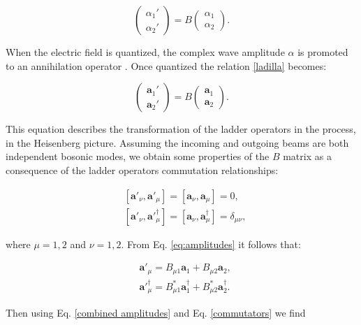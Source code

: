 \documentclass[12pt]{book}
\begin{document}
\begin{equation}
\begin{pmatrix} \alpha_{1}' \\ \alpha_{2}' \end{pmatrix}=B\begin{pmatrix} \alpha_{1} \\ \alpha_{2} \end{pmatrix}. \label{ladilla}
\end{equation}

When the electric field  is quantized, the complex wave amplitude $\alpha$ is promoted to an annihilation operator \cite{ludon}. Once quantized the relation \ref{ladilla} becomes:

\begin{equation}
\begin{pmatrix} \mathbf{a}_{1}' \\ \mathbf{a}_{2}' \end{pmatrix}=B\begin{pmatrix} \mathbf{a}_{1} \\ \mathbf{a}_{2} \end{pmatrix}.
\label{eq:amplitudes}
\end{equation}

This equation describes the transformation of the ladder operators in the process, in the Heisenberg picture. Assuming the incoming and outgoing beams are both independent bosonic modes, we obtain some properties of the $B$ matrix as a consequence of the ladder operators commutation relationships:

\begin{align}
&[\mathbf{a}'_{\nu},\mathbf{a}'_{\mu}]=[\mathbf{a}_{\nu},\mathbf{a}_{\mu}]=0,\\
&[\mathbf{a}'_{\nu},\mathbf{a}'^{\dagger}_{\mu}]=[\mathbf{a}_{\nu},\mathbf{a}^{\dagger}_{\mu}]=\delta_{\mu \nu},
\label{commutators}
\end{align}

where $\mu=1,2$ and $\nu=1,2$. From Eq. \ref{eq:amplitudes} it follows that:

\begin{align}
&\mathbf{a}'_{\mu}=B_{\mu 1}\mathbf{a}_{1}+B_{\mu 2} \mathbf{a}_{2}, \\
&\mathbf{a}'^{\dagger}_{\mu}=B_{\mu 1}^{*}\mathbf{a}^{\dagger}_{1}+B_{\mu 2}^{*} \mathbf{a}^{\dagger}_{2}.
\label{combined amplitudes}
\end{align}

Then using Eq. \ref{combined amplitudes} and Eq. \ref{commutators} we find 
\end{document}
